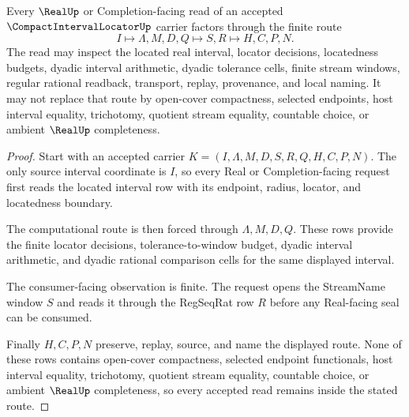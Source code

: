 \begin{theorem}
\label{thm:compact-interval-locator-real-route}
Every $\RealUp$ or Completion-facing read of an accepted $\CompactIntervalLocatorUp$ carrier factors through the finite route
$$
I \longmapsto \Lambda,M,D,Q \longmapsto S,R \longmapsto H,C,P,N .
$$
The read may inspect the located real interval, locator decisions, locatedness budgets, dyadic interval arithmetic, dyadic tolerance cells, finite stream windows, regular rational readback, transport, replay, provenance, and local naming. It may not replace that route by open-cover compactness, selected endpoints, host interval equality, trichotomy, quotient stream equality, countable choice, or ambient $\RealUp$ completeness.
\end{theorem}
\begin{proof}
Start with an accepted carrier $K=(I,\Lambda,M,D,S,R,Q,H,C,P,N)$. The only source interval coordinate is $I$, so every Real or Completion-facing request first reads the located interval row with its endpoint, radius, locator, and locatedness boundary.

The computational route is then forced through $\Lambda,M,D,Q$. These rows provide the finite locator decisions, tolerance-to-window budget, dyadic interval arithmetic, and dyadic rational comparison cells for the same displayed interval.

The consumer-facing observation is finite. The request opens the StreamName window $S$ and reads it through the RegSeqRat row $R$ before any Real-facing seal can be consumed.

Finally $H,C,P,N$ preserve, replay, source, and name the displayed route. None of these rows contains open-cover compactness, selected endpoint functionals, host interval equality, trichotomy, quotient stream equality, countable choice, or ambient $\RealUp$ completeness, so every accepted read remains inside the stated route.
\end{proof}




